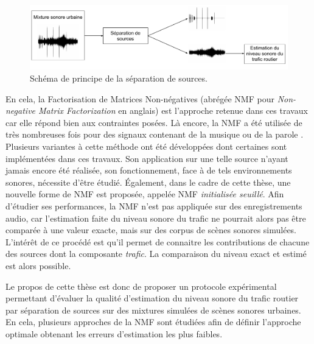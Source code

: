 \begin{figure}[h]
\centering
\includegraphics[width=\linewidth]{./figures/autres/schema_source_separation_FR.pdf}
\caption{Schéma de principe de la séparation de sources.}
\label{fig:separation_source_intro}
\end{figure}


En cela, la Factorisation de Matrices Non-négatives (abrégée NMF pour \textit{Non-negative Matrix Factorization} en anglais) \cite{lee_learning_1999} est l'approche retenue dans ces travaux car elle répond bien aux contraintes posées. Là encore, la NMF a été utilisée de très nombreuses fois pour des signaux contenant de la musique \cite{helen2005separation,fevotte_nonnegative_2009} ou de la parole \cite{wilson2008speech,schmidt2006single}. Plusieurs variantes à cette méthode ont été développées dont certaines sont implémentées dans ces travaux. Son application sur une telle source n'ayant jamais encore été réalisée, son fonctionnement, face à de tels environnements sonores,  nécessite d'être étudié. Également, dans le cadre de cette thèse, une nouvelle forme de NMF est proposée, appelée NMF \textit{initialisée seuillé}.
Afin d'étudier ses performances, la NMF n'est pas appliquée sur des enregistrements audio, car l'estimation faite du niveau sonore du trafic ne pourrait alors pas être comparée à une valeur exacte, mais sur des corpus de scènes sonores simulées. L'intérêt de ce procédé est qu'il permet de connaitre les contributions de chacune des sources dont la composante \textit{trafic}. La comparaison du niveau exact et estimé est alors possible.

Le propos de cette thèse est donc de proposer un protocole expérimental permettant d'évaluer la qualité d'estimation du niveau sonore du trafic routier par séparation de sources sur des mixtures simulées de scènes sonores urbaines. En cela, plusieurs approches de la NMF sont étudiées afin de définir l'approche optimale obtenant les erreurs d'estimation les plus faibles.\\



